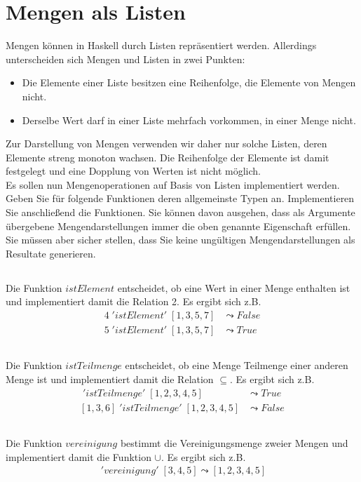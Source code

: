 \documentclass{article}
\begin{document}
\section{Mengen als Listen}
Mengen können in Haskell durch Listen repräsentiert werden. Allerdings unterscheiden
sich Mengen und Listen in zwei Punkten:
\begin{itemize}
  \item Die Elemente einer Liste besitzen eine Reihenfolge, die Elemente von Mengen
nicht.
\item Derselbe Wert darf in einer Liste mehrfach vorkommen, in einer Menge nicht.
\end{itemize}
Zur Darstellung von Mengen verwenden wir daher nur solche Listen, deren Elemente
streng monoton wachsen. Die Reihenfolge der Elemente ist damit festgelegt und eine
Dopplung von Werten ist nicht möglich.\\

Es sollen nun Mengenoperationen auf Basis von Listen implementiert werden. Geben Sie
für folgende Funktionen deren allgemeinste Typen an. Implementieren Sie anschließend
die Funktionen. Sie können davon ausgehen, dass als Argumente übergebene Mengendarstellungen
immer die oben genannte Eigenschaft erfüllen. Sie müssen aber sicher
stellen, dass Sie keine ungültigen Mengendarstellungen als Resultate generieren.
\subsection{}
Die Funktion $istElement$ entscheidet, ob eine Wert in einer
Menge enthalten ist und implementiert damit die Relation 2. Es ergibt sich z.B.
\begin{align*}
4 \;'istElement'\; [1, 3, 5, 7] & \leadsto False\\
5 \;'istElement'\; [1, 3, 5, 7] & \leadsto True
\end{align*}
\subsection{}
Die Funktion $istTeilmenge$ entscheidet, ob eine Menge Teilmenge einer anderen
Menge ist und implementiert damit die Relation $\subseteq$. Es ergibt sich z.B.
\begin{align*}
[1, 3] \;'istTeilmenge'\; [1, 2, 3, 4, 5] & \leadsto True\\
[1, 3, 6] \;'istTeilmenge'\; [1, 2, 3, 4, 5] & \leadsto False
\end{align*}
\subsection{}
Die Funktion $vereinigung$ bestimmt die Vereinigungsmenge zweier Mengen und
implementiert damit die Funktion $\cup$. Es ergibt sich z.B.
\begin{align*}
[1, 2, 4] \;'vereinigung'\; [3, 4, 5] \leadsto [1, 2, 3, 4, 5]
\end{align*}
\end{document}

